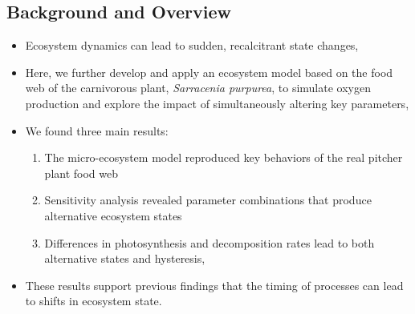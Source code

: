 \documentclass[a0,landscape]{a0poster}
\begin{document}
\begin{multicols}{3} %


\color{DarkBlue} %

\section*{Background and Overview}
  
  \begin{itemize}
  \item Ecosystem dynamics can lead to sudden, recalcitrant state changes,
  \item Here, we further develop and apply an ecosystem model based on
    the food web of the carnivorous plant, \textit{Sarracenia
      purpurea}, to simulate oxygen production and explore the impact
    of simultaneously altering key parameters,
  \item We found three main results:
    \begin{enumerate}
    \item The micro-ecosystem model reproduced key behaviors of
      the real pitcher plant food web
    \item Sensitivity analysis revealed parameter combinations that
      produce alternative ecosystem states
    \item Differences in photosynthesis and decomposition rates lead
      to both alternative states and hysteresis,
    \end{enumerate}
  \item These results support previous findings that the timing of
    processes can lead to shifts in ecosystem state. 
  \end{itemize}





\end{multicols}
\end{document}
